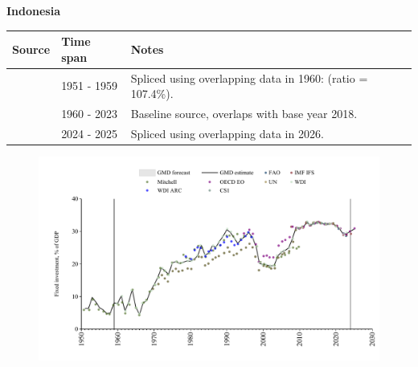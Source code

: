 \documentclass[12pt,a4paper,landscape]{article}
\begin{document}
\begin{adjustbox}{max totalsize={\paperwidth}{\paperheight},center}
\begin{minipage}[t][\textheight][t]{\textwidth}
\vspace*{0.5cm}
{}
\begin{center}
{\Large\bfseries Indonesia}
\end{center}
\vspace{0.5cm}
\begin{table}[H]
\centering
\small
\begin{tabular}{|l|l|l|}
\hline
\textbf{Source} & \textbf{Time span} & \textbf{Notes} \\
\hline
\rowcolor{white}\cite{Mitchell}& 1951 - 1959 &Spliced using overlapping data in 1960: (ratio = 107.4\%).\\
\rowcolor{lightgray}\cite{WDI}& 1960 - 2023 &Baseline source, overlaps with base year 2018.\\
\rowcolor{white}\cite{OECD_EO}& 2024 - 2025 &Spliced using overlapping data in 2026.\\
\hline
\end{tabular}
\end{table}
\begin{figure}[H]
\centering
\includegraphics[width=\textwidth,height=0.6\textheight,keepaspectratio]{graphs/IDN_finv_GDP.pdf}
\end{figure}
\end{minipage}
\end{adjustbox}
\end{document}
